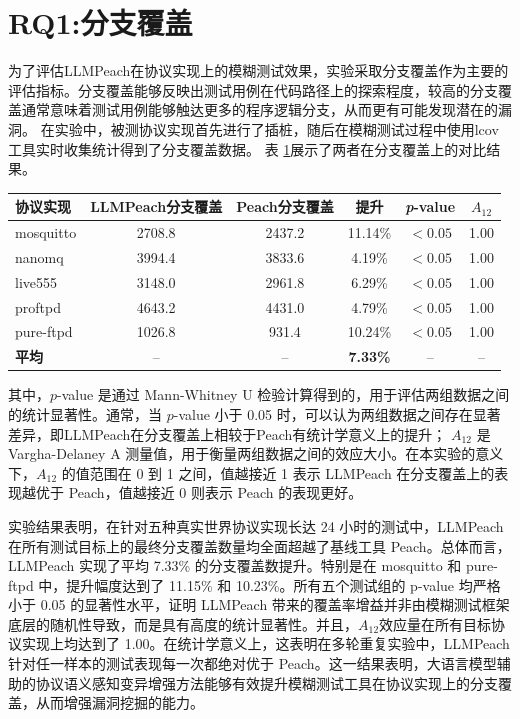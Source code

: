 \section{RQ1:分支覆盖}

为了评估LLMPeach在协议实现上的模糊测试效果，实验采取分支覆盖作为主要的评估指标。分支覆盖能够反映出测试用例在代码路径上的探索程度，较高的分支覆盖通常意味着测试用例能够触达更多的程序逻辑分支，从而更有可能发现潜在的漏洞。
在实验中，被测协议实现首先进行了插桩，随后在模糊测试过程中使用lcov\cite{lcov}工具实时收集统计得到了分支覆盖数据。
表 \ref{tab:branch-coverage}展示了两者在分支覆盖上的对比结果。

\begin{table}[H]
\centering
{}
\label{tab:branch-coverage}
\begin{tabular}{lccccc}
\toprule
{\textbf{协议实现}} 
& {\textbf{LLMPeach分支覆盖}} 
& {\textbf{Peach分支覆盖}}
& {\textbf{提升}} 
& {\textit{p}-value}
& {$A_{12}$} \\
\midrule
mosquitto & 2708.8 & 2437.2 & 11.14\% & $<0.05$ & 1.00 \\
nanomq    & 3994.4 & 3833.6 & 4.19\%  & $<0.05$ & 1.00 \\
live555   & 3148.0 & 2961.8 & 6.29\%  & $<0.05$ & 1.00 \\
proftpd   & 4643.2 & 4431.0 & 4.79\%  & $<0.05$ & 1.00 \\
pure-ftpd & 1026.8 & 931.4  & 10.24\% & $<0.05$ & 1.00 \\
\midrule
\textbf{平均} & -- & -- & \textbf{7.33\%} & -- & -- \\
\bottomrule
\end{tabular}
\end{table}

其中，$p$-value 是通过 Mann-Whitney U 检验\cite{mann1947test}计算得到的，用于评估两组数据之间的统计显著性。通常，当 $p$-value 小于 0.05 时，可以认为两组数据之间存在显著差异，即LLMPeach在分支覆盖上相较于Peach有统计学意义上的提升；
$A_{12}$ 是 Vargha-Delaney A 测量值\cite{vargha2000critique}，用于衡量两组数据之间的效应大小。在本实验的意义下，$A_{12}$ 的值范围在 0 到 1 之间，值越接近 1 表示 LLMPeach 在分支覆盖上的表现越优于 Peach，值越接近 0 则表示 Peach 的表现更好。

实验结果表明，在针对五种真实世界协议实现长达 24 小时的测试中，LLMPeach 在所有测试目标上的最终分支覆盖数量均全面超越了基线工具 Peach。总体而言，LLMPeach 实现了平均 7.33\% 的分支覆盖数提升。特别是在 mosquitto 和 pure-ftpd 中，提升幅度达到了 11.15\% 和 10.23\%。所有五个测试组的 p-value 均严格小于 0.05 的显著性水平，证明 LLMPeach 带来的覆盖率增益并非由模糊测试框架底层的随机性导致，而是具有高度的统计显著性。并且，$A_{12}$效应量在所有目标协议实现上均达到了 1.00。在统计学意义上，这表明在多轮重复实验中，LLMPeach 针对任一样本的测试表现每一次都绝对优于 Peach。这一结果表明，大语言模型辅助的协议语义感知变异增强方法能够有效提升模糊测试工具在协议实现上的分支覆盖，从而增强漏洞挖掘的能力。

